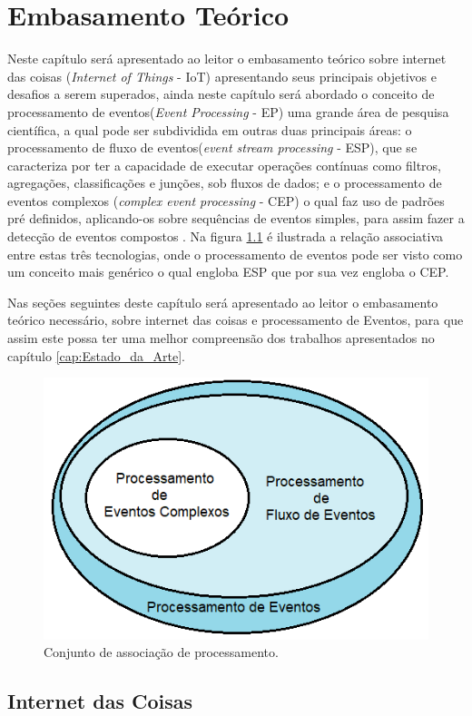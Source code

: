 \documentclass[tid,table]{texufpel} %
\begin{document}
\chapter{Embasamento Teórico}
Neste capítulo será apresentado ao leitor o embasamento teórico sobre internet das coisas (\textit{Internet of Things} - IoT) apresentando seus principais objetivos e desafios a serem superados, ainda neste capítulo será abordado o conceito de processamento de eventos(\textit{Event Processing} - EP) uma grande área de pesquisa científica, a qual pode ser subdividida em outras duas principais áreas: o processamento de fluxo de eventos(\textit{event stream processing} - ESP), que se caracteriza por ter a capacidade de executar operações contínuas como filtros, agregações, classificações e junções, sob fluxos de dados; e o processamento de eventos complexos (\textit{complex event processing} - CEP) o qual faz uso de padrões pré definidos, aplicando-os sobre sequências de eventos simples, para assim fazer a detecção de eventos compostos \cite{dayarathna2018recent}. Na figura \ref{fig:ConjuntoProcessamento} é ilustrada a relação associativa entre estas três tecnologias, onde o processamento de eventos pode ser visto como um conceito mais genérico o qual engloba ESP que por sua vez engloba o CEP.

Nas seções seguintes deste capítulo será apresentado ao leitor o embasamento teórico necessário, sobre internet das coisas e processamento de Eventos, para que assim este possa ter uma melhor compreensão dos trabalhos apresentados no capítulo \ref{cap:Estado_da_Arte}.


\begin{figure}[ht]
	\centering
	\includegraphics[width=.6\textwidth]{imagens/ConjuntoProcessamento.png}
	\caption{Conjunto de associação de processamento.}
	\label{fig:ConjuntoProcessamento}
\end{figure}


\section{Internet das Coisas}
\end{document}
